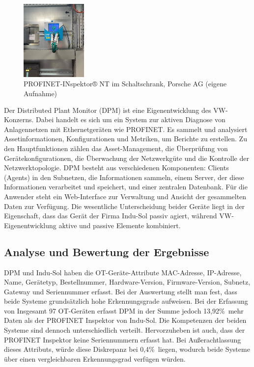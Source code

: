\begin{figure}[H]
    \centering
    \includegraphics[width=0.29\textwidth]{images/PROFINET-INspektor.jpg}
    \caption{PROFINET-INspektor® NT im Schaltschrank, Porsche AG (eigene Aufnahme)}
    \label{fig:PROFINET-INspektor® NT}
\end{figure} 
Der Distributed Plant Monitor (DPM) ist eine Eigenentwicklung des VW-Konzerns. Dabei handelt es sich um ein System zur aktiven Diagnose von Anlagennetzen mit Ethernetgeräten wie PROFINET. Es sammelt und analysiert Assetinformationen, Konfigurationen und Metriken, um Berichte zu erstellen. 
Zu den Hauptfunktionen zählen das Asset-Management, die Überprüfung von Gerätekonfigurationen, die Überwachung der Netzwerkgüte und die Kontrolle der Netzwerktopologie. DPM besteht aus verschiedenen Komponenten: Clients (Agents) in den Subnetzen, die Informationen sammeln, einem Server, der diese Informationen verarbeitet und speichert, und einer zentralen Datenbank. Für die Anwender steht ein Web-Interface zur Verwaltung und Ansicht der gesammelten Daten zur Verfügung. Die wesentliche Unterscheidung beider Geräte liegt in der Eigenschaft, dass das Gerät der Firma Indu-Sol passiv agiert, während VW-Eigenentwicklung aktive und passive Elemente kombiniert. 

\subsection{Analyse und Bewertung der Ergebnisse}

DPM und Indu-Sol haben die OT-Geräte-Attribute MAC-Adresse, IP-Adresse, Name, Gerätetyp, Bestellnummer, Hardware-Version, Firmware-Version, Subnetz, Gateway und Seriennummer erfasst. Bei der Auswertung stellt man fest, dass beide Systeme grundsätzlich hohe Erkennungsgrade aufweisen.  Bei der Erfassung von Insgesamt 97 OT-Geräten erfasst DPM in der Summe jedoch 13,92\%\ mehr Daten als der PROFINET Inspektor von Indu-Sol. 
Die Kompetenzen der beiden Systeme sind dennoch unterschiedlich verteilt. Hervorzuheben ist auch, dass der PROFINET Inspektor keine Seriennummern erfasst hat. Bei Außerachtlassung dieses Attributs, würde diese Diskrepanz bei 0,4\%\ liegen, wodurch beide Systeme über einen vergleichbaren Erkennungsgrad verfügen würden.  
\clearpage

